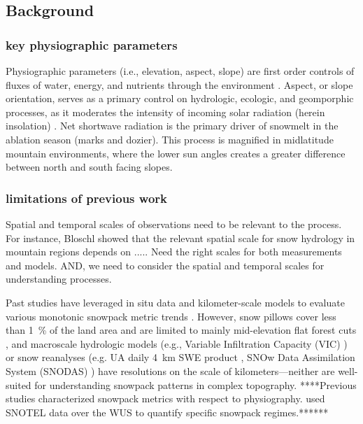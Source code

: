 % 
\subsection{Background}
\subsubsection{key physiographic parameters}
Physiographic parameters (i.e., elevation, aspect, slope) are first order controls of fluxes of water, energy, and nutrients through the environment \citep{pelletierWhichWayYou2018a}. Aspect, or slope orientation, serves as a primary control on hydrologic, ecologic, and geomporphic processes, as it moderates the intensity of incoming solar radiation (herein insolation) \citep{broxtonRoleAspectQuantify2009}. Net shortwave radiation is the primary driver of snowmelt in the ablation season (marks and dozier). This process is magnified in midlatitude mountain environments, where the lower sun angles creates a greater difference between north and south facing slopes. 

\subsubsection{limitations of previous work}
Spatial and temporal scales of observations need to be relevant to the process. For instance, Bloschl showed that the relevant spatial scale for snow hydrology in mountain regions depends on ..... Need the right scales for both measurements and models. 
AND, we need to consider the spatial and temporal scales for understanding processes. 

Past studies have leveraged in situ data \citep{clowChangesTimingSnowmelt2010,harpoldChangesSnowpackAccumulation2012a,kapnickCausesRecentChanges2012,musselmanWinterMeltTrends2021} and kilometer-scale models to evaluate various monotonic snowpack metric trends 
\citep{moteDECLININGMOUNTAINSNOWPACK2005, moteDramaticDeclinesSnowpack2018, zengSnowpackChange19822018, haleDriversSpatiotemporalPatterns2023}. However, snow pillows cover less than 1~\% of the land area and are limited to mainly mid-elevation flat forest cuts \citep{guan20102011Snow2013}, and macroscale hydrologic models (e.g., Variable Infiltration Capacity (VIC) \citep{liangSimpleHydrologicallyBased1994}) or snow reanalyses (e.g. UA daily 4~km SWE product \citep{broxtonLinkingSnowfallSnow2016}, SNOw Data Assimilation System (SNODAS) \citep{barrettNationalOperationalHydrologic2003}) have resolutions on the scale of kilometers---neither are well-suited for understanding snowpack patterns in complex topography.
****Previous studies characterized snowpack metrics with respect to physiography. \cite{trujilloSnowpackRegimesWestern2014} used SNOTEL data over the WUS to quantify specific snowpack regimes.******

